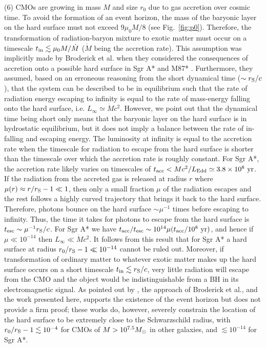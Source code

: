 \documentclass[useAMS,usenatbib]{mn2e}
\begin{document}
(6) CMOs are growing in mass $M$ and size $r_0$ due
to gas accretion over cosmic time. To avoid the formation of an event
horizon, the mass of the baryonic layer on the hard surface must not
exceed $9\mu_0 M/8$ (see Fig.~\ref{fig:p0}). Therefore, the transformation
of radiation-baryon mixture to exotic matter must occur on a 
timescale $t_{\rm in} \lesssim \mu_0 M/\dot{M}$ ($\dot{M}$ being the accretion
rate). This assumption was implicitly made by Broderick et al. when they
considered the consequences of accretion onto a possible hard surface 
in Sgr A* and M87* \cite[e.g.][]{2015ApJ...805..179B}. Furthermore, they
assumed, based on an erroneous reasoning from the short dynamical
time ($\sim r_{\rm S}/c$), that the system can be described to be in
equilibrium such that the rate of radiation energy escaping to 
infinity is equal to the rate of mass-energy falling onto the
hard surface, i.e.  $L_{\infty}\simeq\dot{M}c^2$.
However, we point out that the dynamical time being short only
means that the baryonic layer on the hard surface is in hydrostatic
equilibrium, but it does not imply a balance between the rate of
in-falling and escaping energy. The luminosity at infinity is equal to
the accretion rate when the timescale for radiation to escape from the
hard surface is shorter than the timescale over which the accretion rate 
is roughly constant. For Sgr A*, the accretion rate likely varies on 
timescales of $t_{\rm acc} < Mc^2/L_{\rm Edd}\simeq 3.8\times
10^8\rm\ yr$. If the radiation  
from the accreted gas is released at radius $r$ where $\mu(r)\approx
r/r_{\rm S} -1 \ll1$, then only a small fraction $\mu$ of the
radiation escapes and the  
rest follows a highly curved trajectory that brings it back to the hard surface.
Therefore, photons bounce on the hard surface $\sim\mu^{-1}$
times before escaping to infinity. Thus, the time it takes for photons
to escape from the hard surface is $t_{\rm esc}\sim
\mu^{-1}r_{\rm S}/c$. For Sgr A* we have $t_{\rm acc}/t_{\rm esc}\sim
10^{14} \mu (t_{\rm acc}/10^8\rm\ yr)$, and hence if
$\mu\ll 10^{-14}$ then $L_{\infty}\ll\dot{M}c^2$. It follows from this
result that for Sgr A* a hard surface at radius $r_0/r_{\rm S} - 1\ll
10^{-14}$ cannot be ruled out. Moreover, if transformation of ordinary
matter to whatever exotic matter  makes up the hard surface occurs on
a short timescale $t_{\rm in}\lesssim r_{\rm S}/c$, very little radiation will
escape from the CMO and the object would be
indistinguishable from a BH in its electromagnetic signal.
 As pointed out by \citet{2002A&A...396L..31A}, the approach 
of Broderick et al., and the work presented here, supports the 
existence of the event horizon but does not provide a firm proof; these
works do, however, severely constrain the location of the hard surface
to be extremely close to the Schwarzschild radius, with $r_0/r_{\rm
  S}-1\lesssim 10^{-4}$ for CMOs of $M>10^{7.5}M_{\rm\odot}$ in other
galaxies, and $\lesssim 10^{-14}$ for Sgr A*. 
\end{document}

